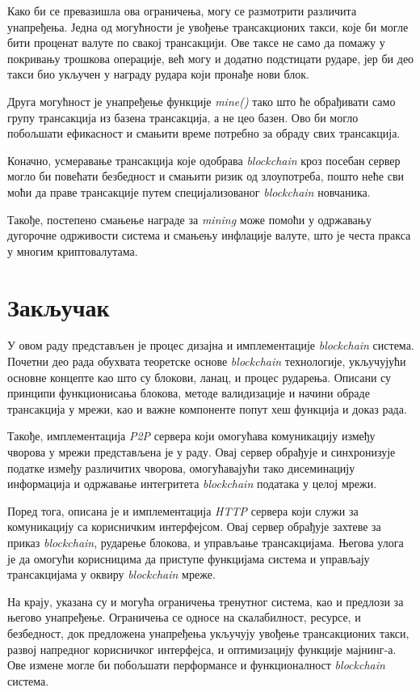 \documentclass[12pt, a4paper]{article}
\begin{document}
Како би се превазишла ова ограничења, могу се размотрити различита унапређења. Једна од могућности је увођење трансакционих такси, које би могле бити проценат валуте по свакој трансакцији. Ове таксе не само да помажу у покривању трошкова операције, већ могу и додатно подстицати рударе, јер би део такси био укључен у награду рудара који пронађе нови блок.

Друга могућност је унапређење функције \textit{mine()} тако што ће обрађивати само групу трансакција из базена трансакција, а не цео базен. Ово би могло побољшати ефикасност и смањити време потребно за обраду свих трансакција.

Коначно, усмеравање трансакција које одобрава \textit{blockchain} кроз посебан сервер могло би повећати безбедност и смањити ризик од злоупотреба, пошто неће сви моћи да праве трансакције путем специјализованог \textit{blockchain} новчаника.

Такође, постепено смањење награде за \textit{mining} може помоћи у одржавању дугорочне одрживости система и смањењу инфлације валуте, што је честа пракса у многим криптовалутама.


\newpage
\section{Закључак}
У овом раду представљен је процес дизајна и имплементације \textit{blockchain} система. Почетни део рада обухвата теоретске основе \textit{blockchain} технологије, укључујући основне концепте као што су блокови, ланац, и процес рударења. Описани су принципи функционисања блокова, методе валидизације и начини обраде трансакција у мрежи, као и важне компоненте попут хеш функција и доказ рада.

Такође, имплементација \textit{P2P} сервера који омогућава комуникацију између чворова у мрежи представљена је у раду. Овај сервер обрађује и синхронизује податке између различитих чворова, омогућавајући тако дисеминацију информација и одржавање интегритета \textit{blockchain} података у целој мрежи.

Поред тога, описана је и имплементација \textit{HTTP} сервера који служи за комуникацију са корисничким интерфејсом. Овај сервер обрађује захтеве за приказ \textit{blockchain}, рударење блокова, и управљање трансакцијама. Његова улога је да омогући корисницима да приступе функцијама система и управљају трансакцијама у оквиру \textit{blockchain} мреже.

На крају, указана су и могућа ограничења тренутног система, као и предлози за његово унапређење. Ограничења се односе на скалабилност, ресурсе, и безбедност, док предложена унапређења укључују увођење трансакционих такси, развој напредног корисничког интерфејса, и оптимизацију функције мајнинг-а. Ове измене могле би побољшати перформансе и функционалност \textit{blockchain} система.
\end{document}

